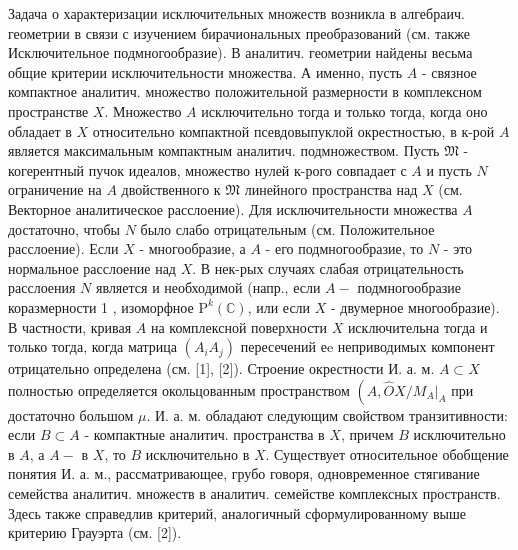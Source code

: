\documentclass[10pt]{article}
\begin{document}
Задача о характеризации исключительных множеств возникла в алгебраич. геометрии в связи с изучением бирачиональных преобразований (см. также Исключительное подмногообразие). В аналитич. геометрии найдены весьма общие критерии исключительности множества. А именно, пусть $A$ - связное компактное аналитич. множество положительной размерности в комплексном пространстве $X$. Множество $A$ исключительно тогда и только тогда, когда оно обладает в $X$ относительно компактной псевдовыпуклой окрестностью, в к-рой $A$ является максимальным компактным аналитич. подмножеством. Пусть $\mathfrak{M}$ - когерентный пучок идеалов, множество нулей к-рого совпадает с $A$ и пусть $N$ ограничение на $A$ двойственного к $\mathfrak{M}$ линейного пространства над $X$ (см. Векторное аналитическое расслоение). Для исключительности множества $A$ достаточно, чтобы $N$ было слабо отрицательным (см. Положительное расслоение). Если $X$ - многообразие, а $A$ - его подмногообразие, то $N$ - это нормальное расслоение над $X$. В нек-рых случаях слабая отрицательность расслоения $N$ является и необходимой (напр., если $A-$ подмногообразие коразмерности 1 , изоморфное $\mathrm{P}^{k}(\mathbb{C})$, или если $X$ - двумерное многообразие). В частности, кривая $A$ на комплексной поверхности $X$ исключительна тогда и только тогда, когда матрица $\left(A_{i} A_{j}\right)$ пересечений еe неприводимых компонент отрицательно определена (см. [1], [2]). Строение окрестности И. а. м. $A \subset X$ полностью определяется окольцованным пространством $\left(A, \widehat{O} X /\left.M_{A}\right|_{A}\right.$ при достаточно большом $\mu$. И. а. м. обладают следующим свойством транзитивности: если $B \subset A$ - компактные аналитич. пространства в $X$, причем $B$ исключительно в $A$, а $A-$ в $X$, то $B$ исключительно в $X$. Существует относительное обобщение понятия И. а. м., рассматривающее, грубо говоря, одновременное стягивание семейства аналитич. множеств в аналитич. семействе комплексных пространств. Здесь также справедлив критерий, аналогичный сформулированному выше критерию Грауэрта (см. [2]).
\end{document}
